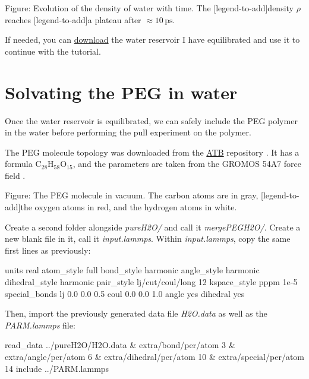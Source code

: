 \vspace{0.25cm} Figure: Evolution of the density of water with time. The
[legend-to-add]density $\rho$ reaches
[legend-to-add]a plateau after $\approx 10\,\text{ps}$.

\vspace{0.25cm} \noindent If needed, you can \href{https://lammpstutorials.github.io/lammpstutorials-inputs/level2/polymer-in-water/pureH2O/H2O.data}{download} the water reservoir I have
equilibrated and use it to continue with the tutorial.

\section{Solvating the PEG in water}
\noindent Once the water reservoir is equilibrated, we can safely
include the PEG polymer in the water before performing the pull experiment
on the polymer.

\vspace{0.25cm} \noindent The PEG molecule topology was downloaded from the \href{https://atb.uq.edu.au/}{ATB}
repository \cite{malde2011automated, oostenbrink2004biomolecular}.
It has a formula $\text{C}_{28}\text{H}_{58}\text{O}_{15}$,
and the parameters are taken from
the GROMOS 54A7 force field \cite{schmid2011definition}.

\vspace{0.25cm} Figure: The PEG molecule in vacuum. The carbon atoms are in gray,
[legend-to-add]the oxygen atoms in red, and the hydrogen atoms in white.

\vspace{0.25cm} \noindent Create a second folder alongside \textit{pureH2O/}
and call it \textit{mergePEGH2O/}. Create a new blank file in it,
call it \textit{input.lammps}. Within \textit{input.lammps}, copy the same first lines as
previously:

\begin{lcverbatim}
units real
atom_style full
bond_style harmonic
angle_style harmonic
dihedral_style harmonic
pair_style lj/cut/coul/long 12
kspace_style pppm 1e-5
special_bonds lj 0.0 0.0 0.5 coul 0.0 0.0 1.0 angle yes dihedral yes
\end{lcverbatim}

\noindent Then, import the previously generated data file \textit{H2O.data}
as well as the \textit{PARM.lammps} file:

\begin{lcverbatim}
read_data ../pureH2O/H2O.data &
    extra/bond/per/atom 3 &
    extra/angle/per/atom 6 &
    extra/dihedral/per/atom 10 &
    extra/special/per/atom 14
include ../PARM.lammps
\end{lcverbatim}

